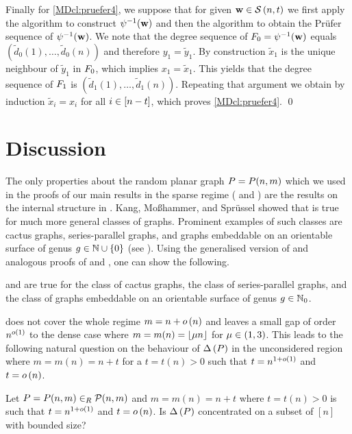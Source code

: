 Finally for \ref{MDcl:pruefer4}, we suppose that for given $\mathbf{w}\in \mathcal{S}\left(n, t\right)$ we first apply the algorithm to construct $\psi^{-1}(\mathbf{w})$ and then the algorithm to obtain the Prüfer sequence of $\psi^{-1}(\mathbf{w})$. We note that the degree sequence of $F_0=\psi^{-1}(\mathbf{w})$ equals $\left(\tilde{d}_0(1), \ldots, \tilde{d}_0(n)\right)$ and therefore $y_1=\tilde{y}_1$. By construction $\tilde{x}_1$ is the unique neighbour of $\tilde{y}_1$ in $F_0$, which implies $x_1=\tilde{x}_1$. This yields that the degree sequence of $F_1$ is $\left(\tilde{d}_1(1), \ldots, \tilde{d}_1(n)\right)$. Repeating that argument we obtain by induction $\tilde{x}_i=x_i$ for all $i\in[n-t]$, which proves \ref{MDcl:pruefer4}. \qed

\section{Discussion}\label{MDsec:discussion}
The only properties about the random planar graph $P=P(n,m)$ which we used in the proofs of our main results in the sparse regime ( and ) are the results on the internal structure in . Kang, Moßhammer, and Sprüssel \cite{KangMosshammerSpruessel2020} showed that  is true for much more general classes of graphs. Prominent examples of such classes are cactus graphs, series-parallel graphs, and graphs embeddable on an orientable surface of genus $g\in \mathbb{N}\cup \{0\}$ (see \cite[Section 4]{KangMissethan2021}). Using the generalised version of  and analogous proofs of  and , one can show the following.
\begin{thm}\label{MDthm:general}
 and  are true for the class of cactus graphs, the class of series-parallel graphs, and the class of graphs embeddable on an orientable surface of genus $g\in \mathbb{N}_0$.
\end{thm}

 does not cover the whole regime $m=n+o\left(n\right)$ and leaves a small gap of order $n^{o\left(1\right)}$ to the dense case where $m=m(n)=\left\lfloor\mu n\right\rfloor$ for $\mu \in(1,3)$. This leads to the following natural question on the behaviour of $\Delta\left(P\right)$ in the unconsidered region where $m=m(n)=n+t$ for a $t=t(n)>0$ such that $t=n^{1+o\left(1\right)}$ and $t=o\left(n\right)$.
\begin{question}
Let $P=P(n,m)\in_R \mathcal{P}(n,m)$ and $m=m(n)=n+t$ where $t=t(n)>0$ is such that $t=n^{1+o\left(1\right)}$ and $t=o\left(n\right)$. Is $\Delta\left(P\right)$ concentrated on a subset of $[n]$ with bounded size?
\end{question}

